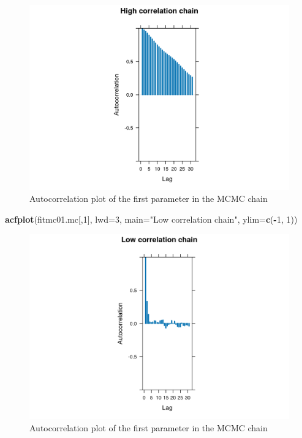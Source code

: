 \documentclass[
]{book}
\newenvironment{Shaded}{\begin{snugshade}}{\end{snugshade}}
\newcommand{\AttributeTok}[1]{\textcolor[rgb]{0.13,0.29,0.53}{#1}}
\newcommand{\DecValTok}[1]{\textcolor[rgb]{0.00,0.00,0.81}{#1}}
\newcommand{\FunctionTok}[1]{\textcolor[rgb]{0.13,0.29,0.53}{\textbf{#1}}}
\newcommand{\NormalTok}[1]{#1}
\newcommand{\SpecialCharTok}[1]{\textcolor[rgb]{0.81,0.36,0.00}{\textbf{#1}}}
\newcommand{\StringTok}[1]{\textcolor[rgb]{0.31,0.60,0.02}{#1}}
\begin{document}
\begin{figure}
\centering
\includegraphics{_bookdown_files/_main_files/figure-html/acf01hc-1.png}
\caption{\label{fig:acf01hc}Autocorrelation plot of the first parameter in the MCMC chain}
\end{figure}

\begin{Shaded}
\begin{Highlighting}[]
\FunctionTok{acfplot}\NormalTok{(fitmc01.mc[,}\DecValTok{1}\NormalTok{], }\AttributeTok{lwd=}\DecValTok{3}\NormalTok{, }\AttributeTok{main=}\StringTok{"Low correlation chain"}\NormalTok{, }\AttributeTok{ylim=}\FunctionTok{c}\NormalTok{(}\SpecialCharTok{{-}}\DecValTok{1}\NormalTok{, }\DecValTok{1}\NormalTok{))}
\end{Highlighting}
\end{Shaded}

\begin{figure}
\centering
\includegraphics{_bookdown_files/_main_files/figure-html/acf01-1.png}
\caption{\label{fig:acf01}Autocorrelation plot of the first parameter in the MCMC chain}
\end{figure}
\end{document}
